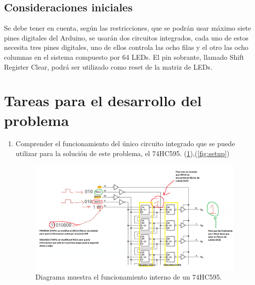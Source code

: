 \documentclass{article}
\begin{document}
\subsection{Consideraciones iniciales}
Se debe tener en cuenta, según las restricciones, que se podrán usar máximo siete pines digitales del Arduino, se usarán dos circuitos integrados, cada uno de estos necesita tres pines digitales, uno de ellos controla las ocho filas y el otro las ocho columnas en el sistema compuesto por 64 LEDs. El pin sobrante, llamado Shift Register Clear, podrá ser utilizado como reset de la matriz de LEDs.

\section{Tareas para el desarrollo del problema} \label{imagenes}
\begin{enumerate}
  \item Comprender el funcionamiento del único circuito integrado que se puede utilizar para la solución de este problema, el 74HC595. (\ref{fig:Funcionamiento74HC595}),(\ref{fig:setup})
  
 \begin{figure}[h]
\includegraphics[scale=0.4]{FUNCIONAMIENTO74HC595.png}
\centering
\caption{Diagrama muestra el funcionamiento interno de un 74HC595.}
\label{fig:Funcionamiento74HC595}
\end{figure}
\newpage


\end{enumerate}
\end{document}
